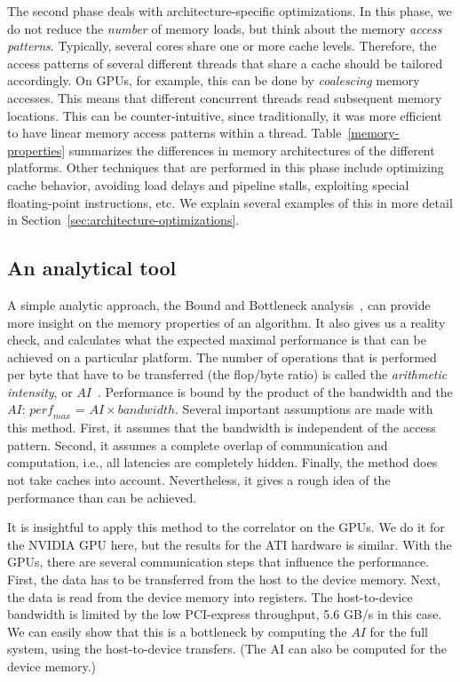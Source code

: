 \documentclass{article}
\begin{document}
The second phase deals with architecture-specific optimizations.
In this phase, we do not reduce the \emph{number} of memory loads, but think about the
memory \emph{access patterns}. Typically, several cores share one or
more cache levels. Therefore, the access patterns of several different
threads that share a cache should be tailored accordingly. On GPUs,
for example, this can be done by \emph{coalescing} memory accesses.
This means that different concurrent threads read subsequent memory
locations.  This can be counter-intuitive, since traditionally, it was
more efficient to have linear memory access patterns within a
thread. Table~\ref{memory-properties} summarizes the differences in
memory architectures of the different platforms.
Other techniques that are performed in this phase include optimizing cache
behavior, avoiding load delays and pipeline stalls, exploiting special floating-point instructions, etc.
We explain several examples of this in more detail in Section~\ref{sec:architecture-optimizations}.


\subsection{An analytical tool}

A simple analytic approach, the Bound and Bottleneck
analysis~\cite{system-performance,roofline}, can provide more insight
on the memory properties of an algorithm. It also gives us a reality
check, and calculates what the expected maximal performance is that can be
achieved on a particular platform.
The number of operations that is performed per byte that have to be
transferred (the flop/byte ratio) is called the \emph{arithmetic intensity}, or
$AI$~\cite{system-performance}.  Performance is bound by the product
of the bandwidth and the $AI$: 
$\mathit{perf_{max}}$ = $AI \times bandwidth$. 
Several important assumptions are made
with this method. First, it assumes that the bandwidth is
independent of the access pattern.  Second, it assumes a complete
overlap of communication and computation, i.e., all latencies
are completely hidden.  Finally, the method does not take caches into
account. Nevertheless, it gives a rough idea of
the performance than can be achieved.

It is insightful to apply this method to the correlator on the GPUs.
We do it for the NVIDIA GPU here, but the results for the ATI hardware is similar.
With the GPUs, there are several communication steps that influence
the performance. First, the data has to be transferred from the host to
the device memory.  Next, the data is read from the device memory into
registers. The host-to-device bandwidth is limited by the low
PCI-express throughput, 5.6 GB/s in this case. We can easily show that this is a bottleneck
by computing the $AI$ for the full system, using the host-to-device transfers. (The AI can also be computed for
the device memory.)
 
\end{document}
